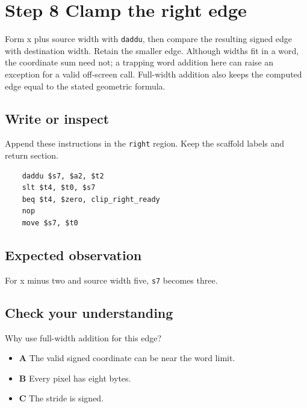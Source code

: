 \section{Step 8 Clamp the right edge}\label{blit-s08}

Form x plus source width with \texttt{daddu}, then compare the resulting signed edge with destination width. Retain the smaller edge. Although widths fit in a word, the coordinate sum need not; a trapping word addition here can raise an exception for a valid off-screen call. Full-width addition also keeps the computed edge equal to the stated geometric formula.

\subsection{Write or inspect}
Append these instructions in the \texttt{right} region. Keep the scaffold labels and return section.

\begin{verbatim}
    daddu $s7, $a2, $t2
    slt $t4, $t0, $s7
    beq $t4, $zero, clip_right_ready
    nop
    move $s7, $t0
\end{verbatim}

\subsection{Expected observation}
For x minus two and source width five, \texttt{s7} becomes three.

\subsection{Check your understanding}
Why use full-width addition for this edge?

\begin{itemize}
  \item \textbf{A} The valid signed coordinate can be near the word limit.
  \item \textbf{B} Every pixel has eight bytes.
  \item \textbf{C} The stride is signed.
\end{itemize}
